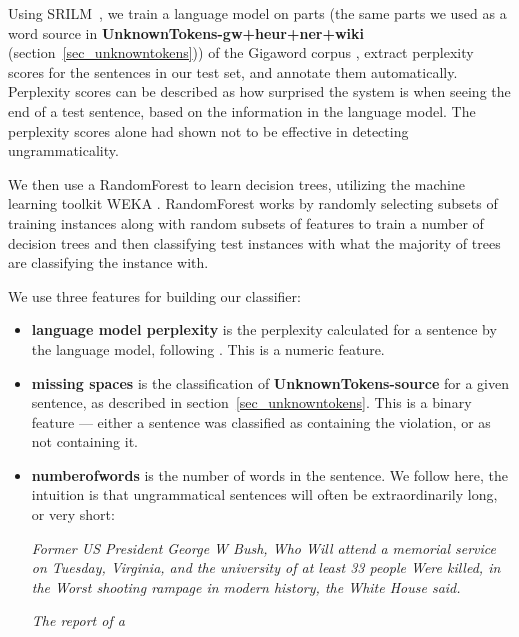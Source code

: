\documentclass[a4paper,10pt]{scrartcl}
\theoremstyle{style}
\begin{document}
Using SRILM~\citep{stolcke2002srilm}, we train a language model on parts (the same parts we used as a word source in \textbf{UnknownTokens-gw+heur+ner+wiki} (section~\ref{sec_unknowntokens})) of the Gigaword corpus \citep{gigaword}, extract perplexity scores for the sentences in our test set, and annotate them automatically. Perplexity scores can be described as how surprised the system is when seeing the end of a test sentence, based on the information in the language model.
The perplexity scores alone had shown not to be effective in detecting ungrammaticality.

We then use a RandomForest \citep{breiman2001random} to learn decision trees, utilizing the machine learning toolkit WEKA \citep{hall2009weka}.
RandomForest works by randomly selecting subsets of training instances along with random subsets of features to train a number of decision trees and then classifying test instances with what the majority of trees are classifying the instance with.

We use three features for building our classifier:

\begin{itemize}
	\item \textbf{language model perplexity} is the perplexity calculated for a sentence by the language model, following \cite{sun2007detecting}. 
	This is a numeric feature.
	\item \textbf{missing spaces} is the classification of \textbf{UnknownTokens-source} for a given sentence, as described in section~\ref{sec_unknowntokens}. This is a binary feature --- either a sentence was classified as containing the violation, or as not containing it.
	\item \textbf{numberofwords} is the number of words in the sentence. We follow \cite{wagner2007comparative} here, the intuition is that ungrammatical sentences will often be extraordinarily long, or very short:

		\textit{Former US President George W Bush, Who Will attend a memorial service on Tuesday, Virginia, and the university of at least 33 people Were killed, in the Worst shooting rampage in modern history, the White House said.}

		\textit{The report of a}
\end{itemize}

\end{document}
